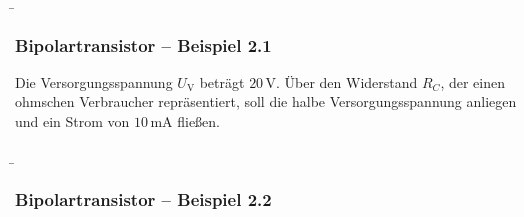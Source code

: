 \begin{frame}
    \b{ \frametitle{Bipolartransistor -- Beispiel 2.1}
            Die Versorgungsspannung $U_\mathrm{V}$ beträgt $20\,\mathrm{V}$. Über den Widerstand $R_C$, 
            der einen ohmschen Verbraucher repräsentiert, soll die halbe Versorgungsspannung anliegen und ein Strom von $10\,\mathrm{mA}$ fließen.
            
            \begin{figure}[H]
                \centering
            \begin{minipage}[b]{0.48\textwidth}
                \raggedright
                \scalebox{0.5}{ }
            \end{minipage}
            \begin{minipage}[b]{0.48\textwidth}
                \raggedleft
                \scalebox{0.8}{}
            \end{minipage}
                
            \end{figure}
    }
\end{frame}

\begin{frame}
    \b{ \frametitle{Bipolartransistor -- Beispiel 2.2}
      \begin{figure}[H]
            \centering
            
        \end{figure}
    }
\end{frame}

